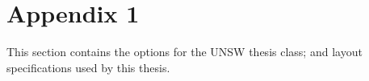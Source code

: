 \chapter{Appendix 1}\label{app1}

This section contains the options for the UNSW thesis class; and
layout specifications used by this thesis.


